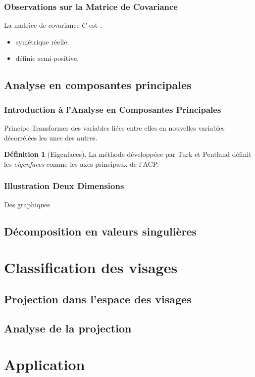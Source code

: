 \documentclass{beamer}
\theoremstyle{plain}
\theoremstyle{definition}
\newtheorem{defi}{Définition}
\begin{document}
\begin{frame}
  \frametitle{Observations sur la Matrice de Covariance}
  La matrice de covariance $C$ est :
  \pause
  \begin{itemize}
  \item symétrique réelle.
    \pause
  \item définie semi-positive.
  \end{itemize}
\end{frame}

\subsection{Analyse en composantes principales}

\begin{frame}
  \frametitle{Introduction à l'Analyse en Composantes Principales}
  \begin{block}{Principe}
    Transformer des variables liées entre elles en nouvelles variables décorrélées les unes des autres.
  \end{block}
  \pause
  \begin{defi}[Eigenfaces]
    La méthode développéee par Turk et Pentland définit les \emph{eigenfaces} comme les axes principaux de l'ACP.
  \end{defi}
\end{frame}

\begin{frame}
  \frametitle{Illustration Deux Dimensions}
  Des graphiques
\end{frame}

\subsection{Décomposition en valeurs singulières}

\section{Classification des visages}
\subsection{Projection dans l'espace des visages}
\subsection{Analyse de la projection}

\section{Application}
\end{document}
